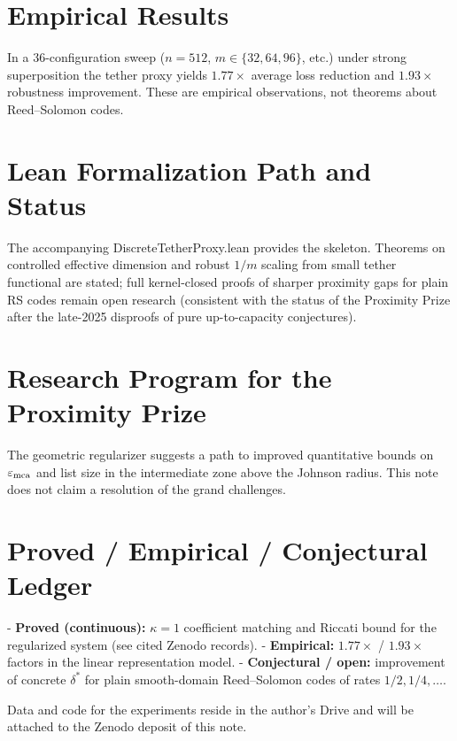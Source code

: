\documentclass{article}
\begin{document}
\section{Empirical Results}
In a 36-configuration sweep ($n=512$, $m\in\{32,64,96\}$, etc.) under strong superposition the tether proxy yields $1.77\times$ average loss reduction and $1.93\times$ robustness improvement. These are empirical observations, not theorems about Reed--Solomon codes.

\section{Lean Formalization Path and Status}
The accompanying DiscreteTetherProxy.lean provides the skeleton. Theorems on controlled effective dimension and robust $1/m$ scaling from small tether functional are stated; full kernel-closed proofs of sharper proximity gaps for plain RS codes remain open research (consistent with the status of the Proximity Prize after the late-2025 disproofs of pure up-to-capacity conjectures).

\section{Research Program for the Proximity Prize}
The geometric regularizer suggests a path to improved quantitative bounds on $\varepsilon_{\rm mca}$ and list size in the intermediate zone above the Johnson radius. This note does not claim a resolution of the grand challenges.

\section{Proved / Empirical / Conjectural Ledger}
- \textbf{Proved (continuous):} $\kappa=1$ coefficient matching and Riccati bound for the regularized system (see cited Zenodo records).
- \textbf{Empirical:} $1.77\times$ / $1.93\times$ factors in the linear representation model.
- \textbf{Conjectural / open:} improvement of concrete $\delta^*$ for plain smooth-domain Reed--Solomon codes of rates $1/2,1/4,\dots$.

Data and code for the experiments reside in the author's Drive and will be attached to the Zenodo deposit of this note.
\end{document}
